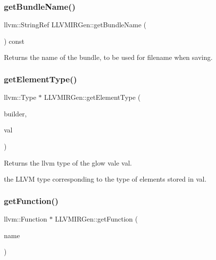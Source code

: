 \subsubsection{\texorpdfstring{get\+Bundle\+Name()}{getBundleName()}}
{\footnotesize\ttfamily llvm\+::\+String\+Ref L\+L\+V\+M\+I\+R\+Gen\+::get\+Bundle\+Name (\begin{DoxyParamCaption}{ }\end{DoxyParamCaption}) const}

\begin{DoxyReturn}{Returns}
the name of the bundle, to be used for filename when saving. 
\end{DoxyReturn}
\mbox{\label{classglow_1_1_l_l_v_m_i_r_gen_a4632479e0de5211cbb0131c232e9b014}} 
\subsubsection{\texorpdfstring{get\+Element\+Type()}{getElementType()}}
{\footnotesize\ttfamily llvm\+::\+Type $\ast$ L\+L\+V\+M\+I\+R\+Gen\+::get\+Element\+Type (\begin{DoxyParamCaption}\item[{llvm\+::\+I\+R\+Builder$<$$>$ \&}]{builder,  }\item[{const \hyperlink{classglow_1_1_value}{Value} $\ast$}]{val }\end{DoxyParamCaption})\hspace{0.3cm}{\ttfamily [protected]}}

\begin{DoxyReturn}{Returns}
the llvm type of the glow vale {\ttfamily val}.

the L\+L\+VM type corresponding to the type of elements stored in {\ttfamily val}. 
\end{DoxyReturn}
\mbox{\label{classglow_1_1_l_l_v_m_i_r_gen_a573dc0804d60a5a7211f11f5d9e9b7b1}} 
\subsubsection{\texorpdfstring{get\+Function()}{getFunction()}\hspace{0.1cm}{\footnotesize\ttfamily [1/2]}}
{\footnotesize\ttfamily llvm\+::\+Function $\ast$ L\+L\+V\+M\+I\+R\+Gen\+::get\+Function (\begin{DoxyParamCaption}\item[{const std\+::string \&}]{name }\end{DoxyParamCaption})\hspace{0.3cm}{\ttfamily [virtual]}}

